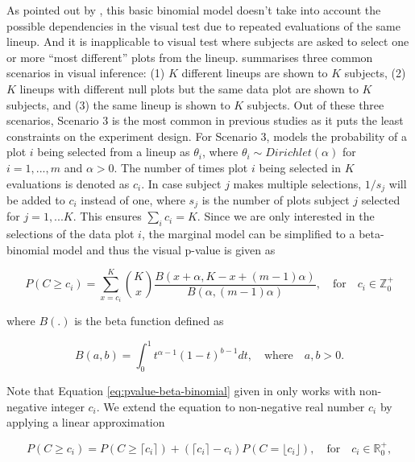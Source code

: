 \documentclass[]{interact}
\theoremstyle{plain}%
\theoremstyle{definition}
\theoremstyle{remark}
\begin{document}
As pointed out by \citet{vanderplas2021statistical}, this basic binomial
model doesn't take into account the possible dependencies in the visual
test due to repeated evaluations of the same lineup. And it is
inapplicable to visual test where subjects are asked to select one or
more ``most different'' plots from the lineup.
\citet{vanderplas2021statistical} summarises three common scenarios in
visual inference: (1) \(K\) different lineups are shown to \(K\)
subjects, (2) \(K\) lineups with different null plots but the same data
plot are shown to \(K\) subjects, and (3) the same lineup is shown to
\(K\) subjects. Out of these three scenarios, Scenario 3 is the most
common in previous studies as it puts the least constraints on the
experiment design. For Scenario 3, \citet{vanderplas2021statistical}
models the probability of a plot \(i\) being selected from a lineup as
\(\theta_i\), where \(\theta_i \sim Dirichlet(\alpha)\) for
\(i=1,...,m\) and \(\alpha > 0\). The number of times plot \(i\) being
selected in \(K\) evaluations is denoted as \(c_i\). In case subject
\(j\) makes multiple selections, \(1/s_j\) will be added to \(c_i\)
instead of one, where \(s_j\) is the number of plots subject \(j\)
selected for \(j=1,...K\). This ensures \(\sum_{i}c_i=K\). Since we are
only interested in the selections of the data plot \(i\), the marginal
model can be simplified to a beta-binomial model and thus the visual
p-value is given as

\begin{equation} \label{eq:pvalue-beta-binomial}
P(C \geq c_i) = \sum_{x=c_i}^{K}{K \choose x}\frac{B(x + \alpha, K - x + (m - 1)\alpha)}{B(\alpha, (m-1)\alpha)},\quad \text{for} \quad c_i \in \mathbb{Z}_0^+
\end{equation}

\noindent where \(B(.)\) is the beta function defined as

\begin{equation} \label{eq:betafunction}
B(a, b) = \int_{0}^{1}t^{\alpha - 1}(1-t)^{b-1}dt,\quad \text{where}\quad a,b>0.
\end{equation}

Note that Equation \ref{eq:pvalue-beta-binomial} given in
\citet{vanderplas2021statistical} only works with non-negative integer
\(c_i\). We extend the equation to non-negative real number \(c_i\) by
applying a linear approximation

\begin{equation} \label{eq:pvalue-beta-binomial-approx}
P(C \geq c_i) = P(C \geq \lceil c_i \rceil) + (\lceil c_i \rceil - c_i) P(C = \lfloor c_i \rfloor), \quad \text{for}\quad c_i \in \mathbb{R}_0^+,
\end{equation}
\end{document}

